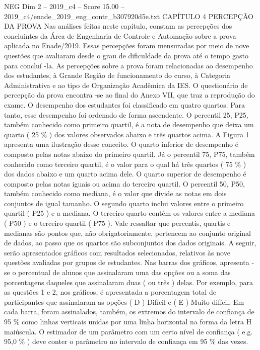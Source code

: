 \begin{textsample}{NEG Dim 2 – 2019\_c4 – Score 15.00 – 2019\_c4/enade\_2019\_eng\_contr\_b307920d5e.txt}  \label{ex:f2_neg_394}
CAPÍTULO 4 PERCEPÇÃO DA PROVA Nas análises feitas neste capítulo, constam as percepções dos concluintes da Área de Engenharia de Controle e Automação sobre a prova aplicada no Enade/2019.
Essas percepções foram mensuradas por meio de nove questões que avaliaram desde o grau de dificuldade da prova até o tempo gasto para concluí -la.
As percepções sobre a prova foram relacionadas ao desempenho dos estudantes, à Grande Região de funcionamento do curso, à Categoria Administrativa e ao tipo de Organização Acadêmica da IES.
O questionário de percepção da prova encontra -se ao final do Anexo VII, que traz a reprodução do exame.
O desempenho dos estudantes foi classificado em quatro quartos.
Para tanto, esse desempenho foi ordenado de forma ascendente.
O percentil 25, P25, também conhecido como primeiro quartil, é a nota de desempenho que deixa um quarto ( 25 \% ) dos valores observados abaixo e três quartos acima.
A Figura 1 apresenta uma ilustração desse conceito.
O quarto inferior de desempenho é composto pelas notas abaixo do primeiro quartil.
Já o percentil 75, P75, também conhecido como terceiro quartil, é o valor para o qual há três quartos ( 75 \% ) dos dados abaixo e um quarto acima dele.
O quarto superior de desempenho é composto pelas notas iguais ou acima do terceiro quartil.
O percentil 50, P50, também conhecido como mediana, é o valor que divide as notas em dois conjuntos de igual tamanho.
O segundo quarto inclui valores entre o primeiro quartil ( P25 ) e a mediana.
O terceiro quarto contém os valores entre a mediana ( P50 ) e o terceiro quartil ( P75 ).
Vale ressaltar que percentis, quartis e medianas são pontos que, não obrigatoriamente, pertencem ao conjunto original de dados, ao passo que os quartos são subconjuntos dos dados originais.
A seguir, serão apresentados gráficos com resultados selecionados, relativos às nove questões avaliadas por grupos de estudantes.
Nas barras dos gráficos, apresenta -se o percentual de alunos que assinalaram uma das opções ou a soma das porcentagens daqueles que assinalaram duas ( ou três ) delas.
Por exemplo, para as questões 1 e 2, nos gráficos, é apresentada a porcentagem total de participantes que assinalaram as opções ( D ) Difícil e ( E ) Muito difícil.
Em cada barra, foram assinalados, também, os extremos do intervalo de confiança de 95 \% como linhas verticais unidas por uma linha horizontal na forma da letra H maiúscula.
O estimador de um parâmetro com um certo nível de confiança ( e.g. 95,0 \% ) deve conter o parâmetro no intervalo de confiança em 95 \% das vezes.

\end{textsample}
